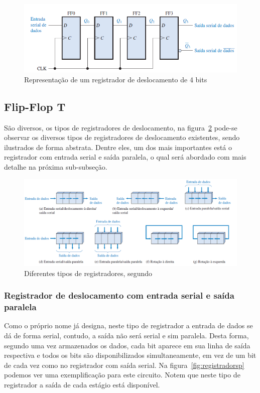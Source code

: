 \documentclass[12pt]{article}
\begin{document}
\begin{figure}[h]
\centering
\includegraphics[width=.7\textwidth]{img/Fig5RegistradorDeslocamento.png}
\caption{Representação de um registrador de deslocamento de 4 bits \cite{floyd2011digital}}
\label{fig:rdeslocamento}
\end{figure}


\subsection{Flip-Flop T}

São diversos, os tipos de registradores de deslocamento, na figura~\ref{fig:registradores} pode-se observar os diversos tipos de registradores de deslocamento existentes, sendo ilustrados de forma abstrata. Dentre eles, um dos mais importantes está o registrador com entrada serial e saída paralela, o qual será abordado com mais detalhe na próxima sub-subseção.

\begin{figure}[h]
\centering
\includegraphics[width=.8\textwidth]{img/Fig6tipodeRegistrador.png}
\caption{Diferentes tipos de registradores, segundo \cite{floyd2011digital}}
\label{fig:registradores}
\end{figure}

\subsubsection{Registrador de deslocamento com entrada serial e saída paralela}

Como o próprio nome já designa, neste tipo de registrador a entrada de dados se dá de forma serial, contudo, a saída não será serial e sim paralela. Desta forma, segundo \cite{floyd2011digital} uma vez armazenados os dados, cada bit aparece em sua linha de saída respectiva e todos os bits são disponibilizados simultaneamente, em vez de um bit de cada vez como no registrador com saída serial. Na figura~\ref{fig:registradorsp} podemos ver uma exemplificação para este circuito. Notem que neste tipo de registrador a saída de cada estágio está disponível.
\end{document}
